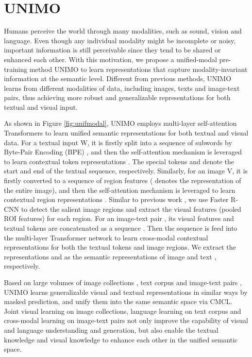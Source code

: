 \documentclass[11pt,a4paper]{article}
\begin{document}
\section{UNIMO}
\label{sec:unimo}

Humans perceive the world through many modalities, such as sound, vision and language. 
Even though any individual modality might be incomplete or noisy, important information is still perceivable since they tend to be shared or enhanced each other. 
With this motivation, we propose a unified-modal pre-training method UNIMO to learn representations that capture modality-invariant information at the semantic level.
Different from previous methods, UNIMO learns from different modalities of data, including images, texts and image-text pairs, thus achieving more robust and generalizable representations for both textual and visual input.


As shown in Figure \ref{fig:unifmodal}, UNIMO employs multi-layer self-attention Transformers to learn unified semantic representations for both textual and visual data.
For a textual input W, it is firstly split into a sequence of subwords  by Byte-Pair Encoding (BPE) \citep{sennrich-etal-2016-neural}, and then the self-attention mechanism is leveraged to learn contextual token representations . The special tokens  and  denote the start and end of the textual sequence, respectively.
Similarly, for an image V, it is firstly converted to a sequence of region features  ( denotes the representation of the entire image), and then the self-attention mechanism is leveraged to learn contextual region representations .
Similar to previous work \citep{chen2020uniter}, we use Faster R-CNN \citep{ren2016faster} to detect the salient image regions and extract the visual features (pooled ROI features) for each region.
For an image-text pair , its visual features and textual tokens are concatenated as a sequence .
Then the sequence is feed into the multi-layer Transformer network to learn cross-modal contextual representations for both the textual tokens and image regions. 
We extract the representations  and  as the semantic representations of image  and text , respectively.

Based on large volumes of image collections , text corpus  and image-text pairs , UNIMO learns generalizable visual and textual representations in similar ways by masked prediction, and unify them into the same semantic space via CMCL.
Joint visual learning on image collections, language learning on text corpus and cross-modal learning on image-text pairs not only improve the capability of visual and language understanding and generation, but also enable the textual knowledge and visual knowledge to enhance each other in the unified semantic space.
\end{document}
